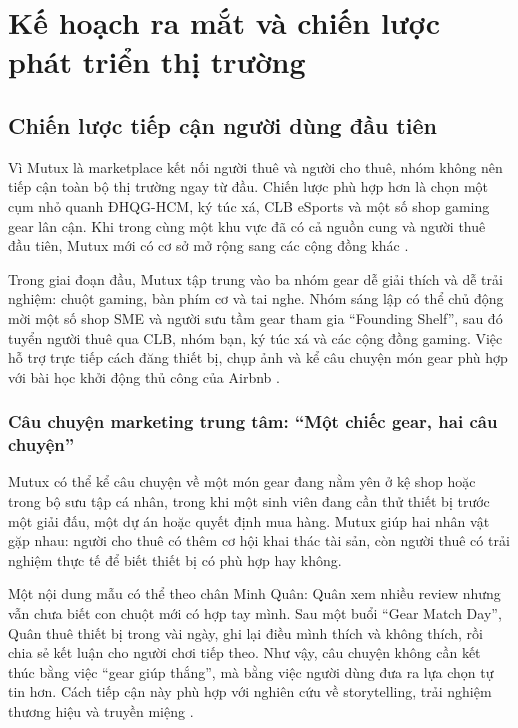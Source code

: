 \section{Kế hoạch ra mắt và chiến lược phát triển thị trường}

\subsection{Chiến lược tiếp cận người dùng đầu tiên}

Vì Mutux là marketplace kết nối người thuê và người cho thuê, nhóm không nên tiếp cận toàn bộ thị trường ngay từ đầu. Chiến lược phù hợp hơn là chọn một cụm nhỏ quanh ĐHQG-HCM, ký túc xá, CLB eSports và một số shop gaming gear lân cận. Khi trong cùng một khu vực đã có cả nguồn cung và người thuê đầu tiên, Mutux mới có cơ sở mở rộng sang các cộng đồng khác \cite{rochetTirole2003,chen2021coldstart}.

Trong giai đoạn đầu, Mutux tập trung vào ba nhóm gear dễ giải thích và dễ trải nghiệm: chuột gaming, bàn phím cơ và tai nghe. Nhóm sáng lập có thể chủ động mời một số shop SME và người sưu tầm gear tham gia ``Founding Shelf'', sau đó tuyển người thuê qua CLB, nhóm bạn, ký túc xá và các cộng đồng gaming. Việc hỗ trợ trực tiếp cách đăng thiết bị, chụp ảnh và kể câu chuyện món gear phù hợp với bài học khởi động thủ công của Airbnb \cite{graham2013scale}.

\subsubsection*{Câu chuyện marketing trung tâm: ``Một chiếc gear, hai câu chuyện''}

Mutux có thể kể câu chuyện về một món gear đang nằm yên ở kệ shop hoặc trong bộ sưu tập cá nhân, trong khi một sinh viên đang cần thử thiết bị trước một giải đấu, một dự án hoặc quyết định mua hàng. Mutux giúp hai nhân vật gặp nhau: người cho thuê có thêm cơ hội khai thác tài sản, còn người thuê có trải nghiệm thực tế để biết thiết bị có phù hợp hay không.

Một nội dung mẫu có thể theo chân Minh Quân: Quân xem nhiều review nhưng vẫn chưa biết con chuột mới có hợp tay mình. Sau một buổi ``Gear Match Day'', Quân thuê thiết bị trong vài ngày, ghi lại điều mình thích và không thích, rồi chia sẻ kết luận cho người chơi tiếp theo. Như vậy, câu chuyện không cần kết thúc bằng việc ``gear giúp thắng'', mà bằng việc người dùng đưa ra lựa chọn tự tin hơn. Cách tiếp cận này phù hợp với nghiên cứu về storytelling, trải nghiệm thương hiệu và truyền miệng \cite{escalas2004narrative,brakus2009brandexperience,nielsen2021trust}.

